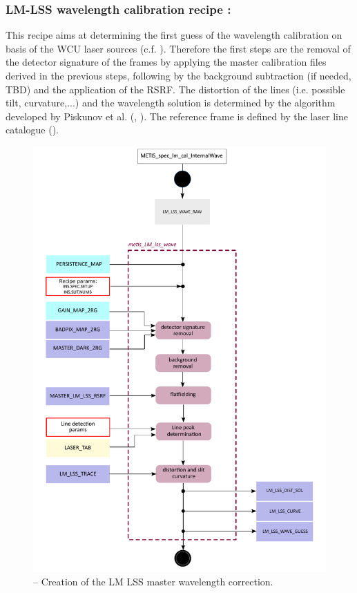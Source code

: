 \clearpage
\subsubsection{LM-LSS wavelength calibration recipe :}\label{rec:lsslmwave}
This recipe aims at determining the first guess of the wavelength calibration on basis of the \ac{WCU} laser sources (c.f. \cite{METIS-calibration_plan}). Therefore the first steps are the removal of the detector signature of the  frames by applying the master calibration files derived in the previous steps, following by the background subtraction (if needed, TBD) and the application of the RSRF. The distortion of the lines (i.e. possible tilt, curvature,...) and the wavelength solution is determined by the algorithm developed by Piskunov et al. (\cite{pis02}, \cite{pis21}). The reference frame is defined by the laser line catalogue (\hyperref[dataitem:lasertab]{}).

\begin{figure}[ht]
  \centering
  \includegraphics[width=0.5\textheight]{figures/metis_lm_lss_wave_v0.74.pdf}
  \caption[Recipe: ]{ --
    Creation of the LM LSS master wavelength correction.}
  \label{Fig:rec_lm_lss_trace}
\end{figure}
\clearpage

